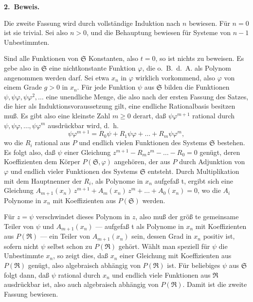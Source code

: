 \documentclass[12pt,a4paper]{article}
\begin{document}
{{\medskip
\noindent\textbf{2.\ Beweis.}

Die zweite Fassung wird durch vollst\"{a}ndige Induktion nach $n$ bewiesen.
F\"{u}r $n=0$ ist sie trivial. Sei also $n>0$, und die Behauptung bewiesen
f\"{u}r Systeme von $n-1$ Unbestimmten.

Sind alle Funktionen von $\mathfrak{S}$ Konstanten, also $t=0$, so ist nichts zu
beweisen. Es gebe also in $\mathfrak{S}$ eine nichtkonstante Funktion $\varphi$, die o.~B.~d.~A.
als Polynom angenommen werden darf. Sei etwa $x_{n}$ in $\varphi$ wirklich
vorkommend, also $\varphi$ von einem Grade $g>0$ in $x_{n}$. F\"{u}r jede Funktion
$\psi$ aus $\mathfrak{S}$ bilden die Funktionen $\psi,\psi\varphi,\psi\varphi^{2},\dots$ eine unendliche
Menge, die also nach der ersten Fassung des Satzes, die hier als Induktionsvoraussetzung
gilt, eine endliche Rationalbasis besitzen mu{\ss}. Es gibt also
eine kleinste Zahl $m\geq 0$ derart, da{\ss} $\psi\varphi^{m+1}$ rational durch $\psi,\psi\varphi,\dots,\psi\varphi^{m}$
ausdr\"{u}ckbar wird, d.~h.
\[
\psi\varphi^{m+1}=R_{0}\psi+R_{1}\psi\varphi+\dots+R_{m}\psi\varphi^{m},
\]
wo die $R_{i}$ rational aus $P$ und endlich vielen Funktionen des Systems
$\mathfrak{S}$ bestehen. Es folgt also, da{\ss} $\psi$ einer Gleichung
$z^{m+1}-R_{m}z^{m}-\dots-R_{0}=0$
gen\"{u}gt, deren Koeffizienten dem K\"{o}rper $P(\mathfrak{S},\varphi)$ angeh\"{o}ren, der aus
$P$ durch Adjunktion von $\varphi$ und endlich vieler Funktionen des Systems
$\mathfrak{S}$ entsteht. Durch Multiplikation mit dem Hauptnenner der $R_{i}$, als
Polynome in $x_{n}$ aufgefa{\ss} t, ergibt sich eine Gleichung
$A_{m+1}(x_{n})\,z^{m+1}+A_{m}(x_{n})\,z^{m}+\dots+A_{0}(x_{n})=0$,
wo die $A_{i}$ Polynome in $x_{n}$ mit Koeffizienten aus $P(\mathfrak{S})$ werden.

F\"{u}r $z=\psi$ verschwindet dieses Polynom in $z$, also mu{\ss} der gr\"{o}{\ss} te
gemeinsame Teiler von $\psi$ und $A_{m+1}(x_{n})$ --- aufgefa{\ss} t als Polynome
in $x_{n}$ mit Koeffizienten aus $P(\mathfrak{R})$ --- ein Teiler von $A_{m+1}(x_{n})$
sein, dessen Grad in $x_{n}$ positiv ist, sofern nicht $\psi$ selbst schon zu
$P(\mathfrak{R})$ geh\"{o}rt. W\"{a}hlt man speziell f\"{u}r $\psi$ die Unbestimmte $x_{n}$, so zeigt
dies, da{\ss} $x_{n}$ einer Gleichung mit Koeffizienten aus $P(\mathfrak{R})$ gen\"{u}gt, also
algebraisch abh\"{a}ngig von $P(\mathfrak{R})$ ist. F\"{u}r beliebiges $\psi$ aus $\mathfrak{S}$ folgt dann,
da{\ss} $\psi$ rational durch $x_{n}$ und endlich viele Funktionen aus $\mathfrak{R}$ ausdr\"{u}ckbar
ist, also auch algebraisch abh\"{a}ngig von $P(\mathfrak{R})$. Damit ist die zweite
Fassung bewiesen.

}}
\end{document}
